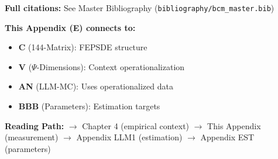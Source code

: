 \textbf{Full citations:} See Master Bibliography (\texttt{bibliography/bcm\_master.bib})


\begin{tcolorbox}[colback=gray!10!white, colframe=gray!75!black,
    title=\textbf{Cross-Reference Footer}]
\label{sec:E-footer}

\textbf{This Appendix (E) connects to:}
\begin{itemize}[nosep]
    \item \textbf{C} (144-Matrix): FEPSDE structure
    \item \textbf{V} ($\Psi$-Dimensions): Context operationalization
    \item \textbf{AN} (LLM-MC): Uses operationalized data
    \item \textbf{BBB} (Parameters): Estimation targets
\end{itemize}

\textbf{Reading Path:}
$\rightarrow$ Chapter 4 (empirical context) $\rightarrow$ This Appendix (measurement)
$\rightarrow$ Appendix LLM1 (estimation) $\rightarrow$ Appendix EST (parameters)

\end{tcolorbox}
